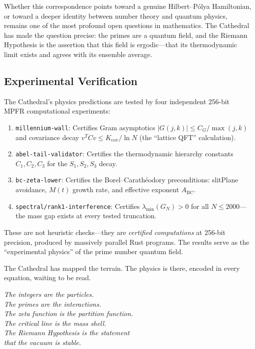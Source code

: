 \documentclass[11pt,a4paper]{article}
\theoremstyle{definition}
\begin{document}
Whether this correspondence points toward a genuine Hilbert--P\'olya
Hamiltonian, or toward a deeper identity between number theory and
quantum physics, remains one of the most profound open questions in
mathematics. The Cathedral has made the question precise: the primes
are a quantum field, and the Riemann Hypothesis is the assertion that
this field is ergodic---that its thermodynamic limit exists and
agrees with its ensemble average.

\subsection{Experimental Verification}

The Cathedral's physics predictions are tested by four independent
256-bit MPFR computational experiments:
\begin{enumerate}
  \item \texttt{millennium-wall}: Certifies Gram asymptotics
    $|G(j,k)| \leq C_G/\max(j,k)$ and covariance decay
    $v^T C v \leq K_{\mathrm{cov}}/\ln N$ (the ``lattice QFT'' calculation).
  \item \texttt{abel-tail-validator}: Certifies the thermodynamic
    hierarchy constants $C_1, C_2, C_3$ for the $S_1, S_2, S_3$ decay.
  \item \texttt{bc-zeta-lower}: Certifies the Borel--Carath\'eodory
    preconditions: slitPlane avoidance, $M(t)$ growth rate, and
    effective exponent $A_{\mathrm{BC}}$.
  \item \texttt{spectral/rank1-interference}: Certifies
    $\lambda_{\min}(G_N) > 0$ for all $N \leq 2000$---the mass gap
    exists at every tested truncation.
\end{enumerate}
These are not heuristic checks---they are \emph{certified computations}
at 256-bit precision, produced by massively parallel Rust programs.
The results serve as the ``experimental physics'' of the prime number
quantum field.

The Cathedral has mapped the terrain. The physics is there,
encoded in every equation, waiting to be read.

\begin{flushright}
\emph{The integers are the particles.\\
The primes are the interactions.\\
The zeta function is the partition function.\\
The critical line is the mass shell.\\
The Riemann Hypothesis is the statement\\
that the vacuum is stable.}
\end{flushright}
\end{document}
